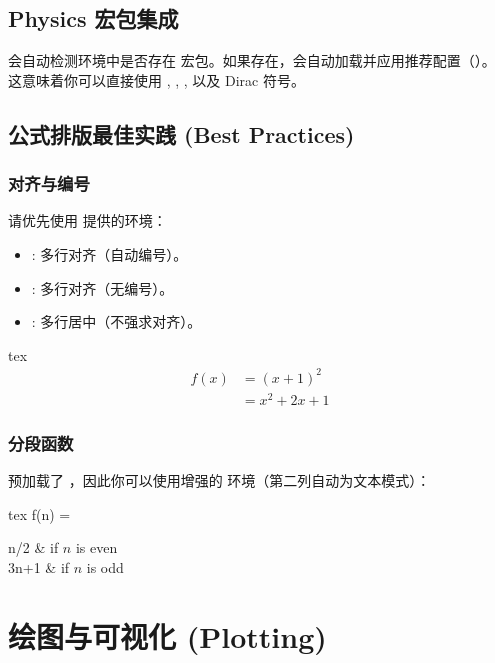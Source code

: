 \documentclass[
    outputdir=build,
    colorscheme=Tech,
    shorthand=true,
    code=true,
    fontset=lit
]{Hypo-Note}
\begin{document}
\section{Physics 宏包集成}

 会自动检测环境中是否存在  宏包。如果存在，会自动加载并应用推荐配置（）。
这意味着你可以直接使用 , , ,  以及 Dirac 符号。



\section{公式排版最佳实践 (Best Practices)}

\subsection{对齐与编号}

请优先使用  提供的环境：
\begin{itemize}
    \item {}: 多行对齐（自动编号）。
    \item {}: 多行对齐（无编号）。
    \item {}: 多行居中（不强求对齐）。
\end{itemize}

\begin{hypocode}{tex}
\begin{align}
    f(x) &= (x+1)^2 \\
         &= x^2 + 2x + 1
\end{align}
\end{hypocode}

\subsection{分段函数}
 预加载了 ，因此你可以使用增强的  环境（第二列自动为文本模式）：

\begin{hypocode}{tex}
f(n) = \begin{cases*}
    n/2 & if $n$ is even \\
    3n+1 & if $n$ is odd
\end{cases*}
\end{hypocode}

\chapter{绘图与可视化 (Plotting)}
\end{document}
